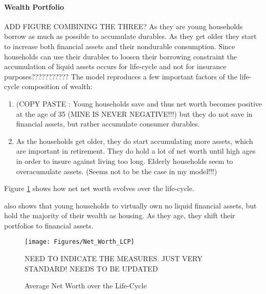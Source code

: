 \documentclass[a4paper,12pt]{article}
\begin{document}
\paragraph{Wealth Portfolio}
ADD FIGURE COMBINING THE THREE? 
As they are young households borrow as much as possible to accumulate durables. As they get older they start to increase both financial assets and their nondurable consumption. Since households can use their durables to loosen their borrowing constraint the accumulation of liquid assets occurs for life-cycle and not for insurance purposes???????????
The model reproduces a few important factors of the life-cycle composition of wealth:
\begin{enumerate}
\item (COPY PASTE \citep{FV&K2011}: Young households save and thus net worth becomes positive at the age of 35 (MINE IS NEVER NEGATIVE!!!) but they do not save in financial assets, but rather accumulate consumer durables.
\item As the households get older, they do start accumulating more assets, which are important in retirement. They do hold a lot of net worth until high ages in order to insure against living too long. 
Elderly households seem to overacumulate assets. (Seems not to be the case in my model!!!)
\end{enumerate}

Figure \ref{Net_LCP} shows how net net worth evolves over the life-cycle. 

\cite{yang2009} also shows that young households to virtually own no liquid financial assets, but hold the majority of their wealth as housing. As they age, they shift their portfolios to financial assets.

\begin{figure}[!htbp]
\caption{Average Net Worth over the Life-Cycle} 
\label{Net_LCP}	%
\centering
\texttt{[image: Figures/Net\_Worth\_LCP]}  %

\begin{minipage}{0.8\linewidth}
\footnotesize{NEED TO INDICATE THE MEASURES. JUST VERY STANDARD! NEEDS TO BE UPDATED}
\end{minipage}

\end{figure}
\end{document}
